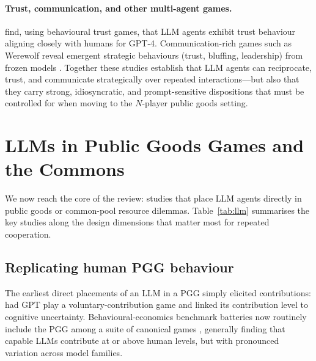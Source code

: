 \documentclass[11pt,a4paper]{article}
\begin{document}
\paragraph{Trust, communication, and other multi-agent games.}
\citet{xie2024trust} find, using behavioural trust games, that LLM agents exhibit
trust behaviour aligning closely with humans for GPT-4. Communication-rich games
such as Werewolf reveal emergent strategic behaviours (trust, bluffing,
leadership) from frozen models \citep{xu2023werewolf}. Together these studies
establish that LLM agents can reciprocate, trust, and communicate strategically
over repeated interactions---but also that they carry strong, idiosyncratic, and
prompt-sensitive dispositions that must be controlled for when moving to the
$N$-player public goods setting.

\section{LLMs in Public Goods Games and the Commons}
\label{sec:llmpgg}

We now reach the core of the review: studies that place LLM agents directly in
public goods or common-pool resource dilemmas. Table~\ref{tab:llm} summarises the
key studies along the design dimensions that matter most for repeated cooperation.

\subsection{Replicating human PGG behaviour}

The earliest direct placements of an LLM in a PGG simply elicited contributions:
\citet{bao2023cognitive} had GPT play a voluntary-contribution game and linked its
contribution level to cognitive uncertainty. Behavioural-economics benchmark
batteries now routinely include the PGG among a suite of canonical games
\citep{mei2024turing,xie2024chatbots,leng2023llmsocial}, generally finding that
capable LLMs contribute at or above human levels, but with pronounced variation
across model families.
\end{document}
